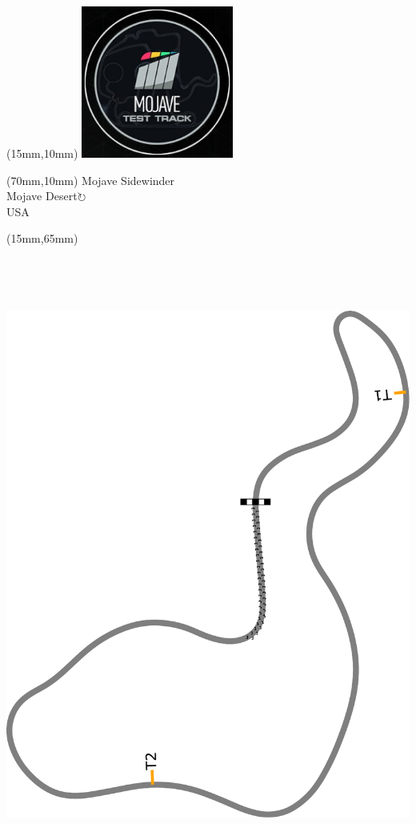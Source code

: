 \null\newpage
\begin{textblock*}{50mm}(15mm,10mm)%
\includegraphics[width=50mm]{LG/MOJA.png}
\end{textblock*}
\begin{textblock*}{130mm}(70mm,10mm)%
{\fontsize{20}{20}\selectfont Mojave Sidewinder\\}
{\fontsize{16}{16}\selectfont Mojave Desert\hfill \Large$\circlearrowright$\\}
{\fontsize{12}{12}\selectfont USA\\}
\end{textblock*}
\begin{textblock*}{185mm}(15mm,65mm)%
\centering
\mbox{\includegraphics[width=185mm,height=210mm,keepaspectratio]{PT/MOJASW.pdf}}
\end{textblock*}
